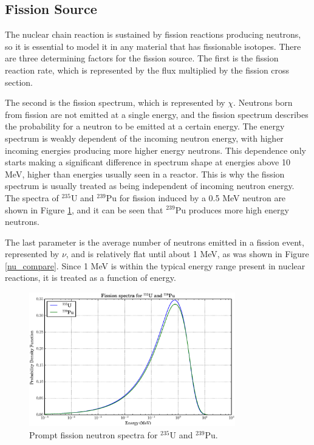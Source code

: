  \subsection{Fission Source}

The nuclear chain reaction is sustained by fission reactions producing neutrons, so it is essential to model it in any material that has fissionable isotopes.  There are three determining factors for the fission source.  The first is the fission reaction rate, which is represented by the flux multiplied by the fission cross section.  

The second is the fission spectrum, which is represented by $\chi$.  Neutrons born from fission are not emitted at a single energy, and the fission spectrum describes the probability for a neutron to be emitted at a certain energy.  The energy spectrum is weakly dependent of the incoming neutron energy, with higher incoming energies producing more higher energy neutrons.  This dependence only starts making a significant difference in spectrum shape at energies above 10 MeV, higher than energies usually seen in a reactor.  This is why the fission spectrum is usually treated as being independent of incoming neutron energy. The spectra of $^{235}$U and $^{239}$Pu for fission induced by a 0.5 MeV neutron are shown in Figure \ref{fiss_spec}, and it can be seen that $^{239}$Pu produces more high energy neutrons.  

The last parameter is the average number of neutrons emitted in a fission event, represented by $\nu$, and is relatively flat until about 1 MeV, as was shown in Figure \ref{nu_compare}.  Since 1 MeV is within the typical energy range present in nuclear reactions, it is treated as a function of energy.

\begin{figure}[h!] 
  \centering
    \includegraphics[width=0.8\textwidth ]{graphics/fiss_spec.eps} 
     \caption{Prompt fission neutron spectra for $^{235}$U and $^{239}$Pu. \label{fiss_spec}}
\end{figure}

